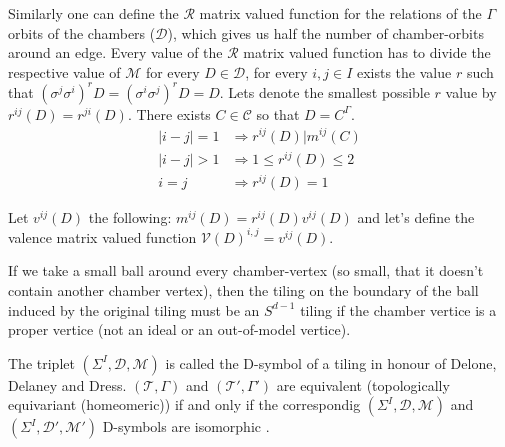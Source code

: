 \documentclass[12pt,a4paper]{article}
\theoremstyle{plain}%
\theoremstyle{definition}
\theoremstyle{remark}
\begin{document}
Similarly one can define the $\mathcal{R}$ matrix valued function for the
relations of the $\Gamma$ orbits of the chambers ($\mathcal{D}$), which gives us
half the number of chamber-orbits around an edge. Every value of the $\mathcal{R}$
matrix valued function has to divide the respective value of $\mathcal{M}$ for
every $D\in\mathcal{D}$, for every $i,j\in I$ exists the value $r$ such that
$(\sigma^j\sigma^i)^rD=(\sigma^i\sigma^j)^rD=D$. Lets denote the smallest
possible $r$ value by $r^{ij}(D)=r^{ji}(D)$. There exists $C\in\mathcal{C}$ so
that $D=C^\Gamma$.
\begin{align}
  |i-j|=1 & \Rightarrow r^{ij}(D)|m^{ij}(C) \\
  |i-j|>1 & \Rightarrow 1\leq r^{ij}(D)\leq 2 \\
  i=j & \Rightarrow r^{ij}(D)=1
\end{align}

Let $v^{ij}(D)$ the following: $m^{ij}(D)=r^{ij}(D)v^{ij}(D)$ and
let's define the valence matrix valued function
$\mathcal{V}(D)^{i,j}=v^{ij}(D)$.


If we take a small ball around every chamber-vertex (so small, that it doesn't
contain another chamber vertex), then the tiling on the boundary of the ball
induced by the original tiling must be an $S^{d-1}$ tiling \cite{D87} if the
chamber vertice is a proper vertice (not an ideal or an out-of-model vertice).

The triplet $(\Sigma^I,\mathcal{D},\mathcal{M})$ is called the D-symbol of a
tiling in honour of Delone, Delaney and Dress. $(\mathcal{T},\Gamma)$ and
$(\mathcal{T}',\Gamma')$ are equivalent (topologically equivariant (homeomeric))
if and only if the correspondig $(\Sigma^I,\mathcal{D},\mathcal{M})$ and
$(\Sigma^I,\mathcal{D}',\mathcal{M}')$ D-symbols are isomorphic \cite{D87}.
\end{document}
